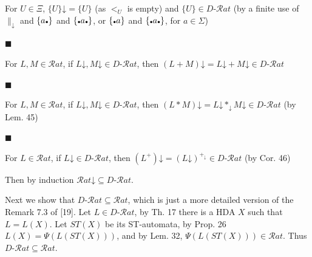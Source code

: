 \documentclass[10pt,a4paper]{article}
\begin{document}
For $U\in\Xi$, ${\{U\}}\mathord{\downarrow}={\{U\}}$ (as $<_{U}$ is empty) and ${\{U\}}\in D\text{-}\mathcal{R}at$ (by a finite use of $\parallel_{\mathord{\downarrow}}$ and ${\{a\vbox{\hbox{\tiny$\bullet$}}\}}$ and ${\{\vbox{\hbox{\tiny$\bullet$}}a\vbox{\hbox{\tiny$\bullet$}}\}}$, or ${\{\vbox{\hbox{\tiny$\bullet$}}a\}}$ and ${\{\vbox{\hbox{\tiny$\bullet$}}a\vbox{\hbox{\tiny$\bullet$}}\}}$, for $a\in\Sigma$)\par
 
 
 
\par\noindent  $\blacksquare$ 
 
For $L,M\in\mathcal{R}at$, if $L\mathord{\downarrow},M\mathord{\downarrow}\in D\text{-}\mathcal{R}at$, then $(L+M)\mathord{\downarrow}=L\mathord{\downarrow}+M\mathord{\downarrow}\in D\text{-}\mathcal{R}at$\par
 
 
 
\par\noindent  $\blacksquare$ 
 
For $L,M\in\mathcal{R}at$, if $L\mathord{\downarrow},M\mathord{\downarrow}\in D\text{-}\mathcal{R}at$, then $(L*M)\mathord{\downarrow}=L\mathord{\downarrow}*_{\mathord{\downarrow}}M\mathord{\downarrow}\in D\text{-}\mathcal{R}at$ (by Lem. 45)\par
 
 
 
\par\noindent  $\blacksquare$ 
 
For $L\in\mathcal{R}at$, if $L\mathord{\downarrow}\in D\text{-}\mathcal{R}at$, then $(L^{+})\mathord{\downarrow}=(L\mathord{\downarrow})^{+_{\mathord{\downarrow}}}\in D\text{-}\mathcal{R}at$ (by Cor. 46)\par
 
 
  
Then by induction $\mathcal{R}at\mathord{\downarrow}\subseteq D\text{-}\mathcal{R}at$.\par
 
 
 
Next we show that $D\text{-}\mathcal{R}at\subseteq\mathcal{R}at$, which is just a more detailed version of the Remark 7.3 of [19]. Let $L\in D\text{-}\mathcal{R}at$, by Th. 17 there is a HDA $X$ such that $L=L(X)$. Let $ST(X)$ be its ST-automata, by Prop. 26 $L(X)=\Psi(L(ST(X)))$, and by Lem. 32, $\Psi(L(ST(X)))\in\mathcal{R}at$. Thus $D\text{-}\mathcal{R}at\subseteq\mathcal{R}at$.\par
 
\end{document}
